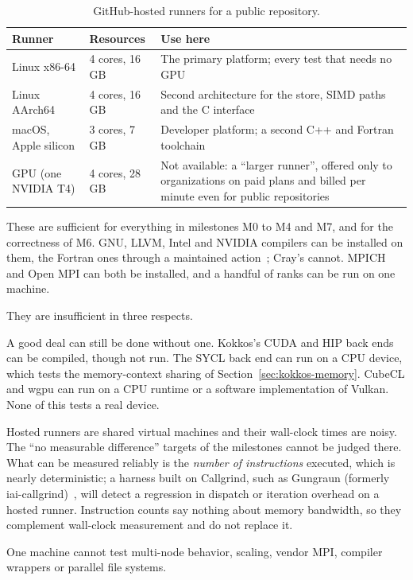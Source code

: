 \documentclass[11pt,a4paper]{article}
\begin{document}
\begin{table}[ht]
\centering
\small
\begin{tabularx}{\textwidth}{@{}l l L@{}}
\toprule
Runner & Resources & Use here \\
\midrule
Linux x86-64 & 4 cores, 16\,GB & The primary platform; every test that needs no GPU \\
Linux AArch64 & 4 cores, 16\,GB & Second architecture for the store, SIMD paths and the C interface \\
macOS, Apple silicon & 3 cores, 7\,GB & Developer platform; a second C++ and Fortran toolchain \\
GPU (one NVIDIA T4) & 4 cores, 28\,GB & Not available: a \enquote{larger runner}, offered only to organizations on paid plans and billed per minute even for public repositories~\cite{ghlarger} \\
\bottomrule
\end{tabularx}
\caption{GitHub-hosted runners for a public repository.}
\label{tab:runners}
\end{table}

These are sufficient for everything in milestones M0 to M4 and M7, and for
the correctness of M6.  GNU, LLVM, Intel and NVIDIA compilers can be
installed on them, the Fortran ones through a maintained
action~\cite{setupfortran}; Cray's cannot.  MPICH and Open MPI can both be
installed, and a handful of ranks can be run on one machine.

They are insufficient in three respects.

\begin{description}[style=nextline,leftmargin=2em]
  \item[No GPU.]
        A good deal can still be done without one.  Kokkos's CUDA and HIP
        back ends can be compiled, though not run.  The SYCL back end can
        run on a CPU device, which tests the memory-context sharing of
        Section~\ref{sec:kokkos-memory}.  CubeCL and wgpu can run on a CPU
        runtime or a software implementation of Vulkan.  None of this tests
        a real device.
  \item[No trustworthy timing.]
        Hosted runners are shared virtual machines and their wall-clock
        times are noisy.  The \enquote{no measurable difference} targets of
        the milestones cannot be judged there.  What can be measured
        reliably is the \emph{number of instructions} executed, which is
        nearly deterministic; a harness built on Callgrind, such as
        Gungraun (formerly iai-callgrind)~\cite{gungraun}, will detect a
        regression in
        dispatch or iteration overhead on a hosted runner.  Instruction
        counts say nothing about memory bandwidth, so they complement
        wall-clock measurement and do not replace it.
  \item[No cluster.]
        One machine cannot test multi-node behavior, scaling, vendor MPI,
        compiler wrappers or parallel file systems.
\end{description}
\end{document}
